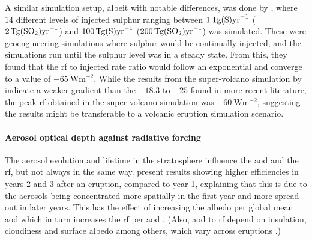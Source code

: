 \documentclass{ametsocV5}
\begin{document}
A similar simulation setup, albeit with notable differences, was done by
\citet{niemeier2015}, where \(14\) different levels of injected sulphur ranging between
\(\SI{1}{\tera\gram(\ce{S})\mathrm{yr}^{-1}}\)
(\(\SI{2}{\tera\gram(\ce{SO2})\mathrm{yr}^{-1}}\)) and
\(\SI{100}{\tera\gram(\ce{S})\mathrm{yr}^{-1}}\)
(\(\SI{200}{\tera\gram(\ce{SO2})\mathrm{yr}^{-1}}\)) was simulated. These were
geoengineering simulations where sulphur would be continually injected, and the
simulations run until the sulphur level was in a steady state. From this, they found
that the \ac{rf} to injected rate ratio would follow an exponential and converge to a
value of \(\SI{-65}{\watt\metre^{-2}}\). While the results from the super-volcano
simulation by \citet{jones2005} indicate a weaker gradient than the \(-18.3\) to \(-25\)
found in more recent literature, the peak \ac{rf} obtained in the super-volcano
simulation was \(\SI{-60}{\watt\metre^{-2}}\), suggesting the \citet{niemeier2015}
results might be transferable to a volcanic eruption simulation scenario.

\paragraph*{Aerosol optical depth against radiative forcing}

The aerosol evolution and lifetime in the stratosphere influence the \ac{aod} and the
\ac{rf}, but not always in the same way. \citet{marshall2020} present results showing
higher efficiencies in years 2 and 3 after an eruption, compared to year 1, explaining
that this is due to the aerosols being concentrated more spatially in the first year and
more spread out in later years. This has the effect of increasing the albedo per global
mean \ac{aod} which in turn increases the \ac{rf} per \ac{aod} \citep{marshall2020}.
(Also, \ac{aod} to \ac{rf} depend on insulation, cloudiness and surface albedo among
others, which vary across eruptions \citep{marshall2021,andersson2015}.)

\end{document}
